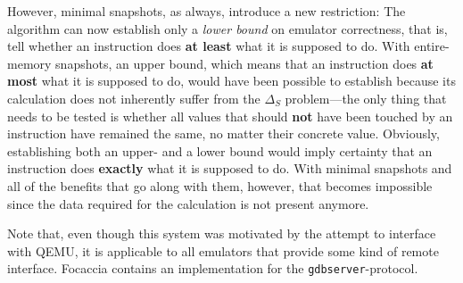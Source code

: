 However, minimal snapshots, as always, introduce a new restriction: The algorithm can now establish only a \textit{lower
bound} on emulator correctness, that is, tell whether an instruction does \textbf{at least} what it is supposed to do.
With entire-memory snapshots, an upper bound, which means that an instruction does \textbf{at most} what it is supposed
to do, would have been possible to establish because its calculation does not inherently suffer from the $\Delta_S$
problem---the only thing that needs to be tested is whether all values that should \textbf{not} have been touched by an
instruction have remained the same, no matter their concrete value. Obviously, establishing both an upper- and a lower
bound would imply certainty that an instruction does \textbf{exactly} what it is supposed to do. With minimal snapshots
and all of the benefits that go along with them, however, that becomes impossible since the data required for the
calculation is not present anymore.

Note that, even though this system was motivated by the attempt to interface with QEMU, it is applicable to all
emulators that provide some kind of remote interface. Focaccia contains an implementation for the
\texttt{gdbserver}-protocol.



%
%
%
